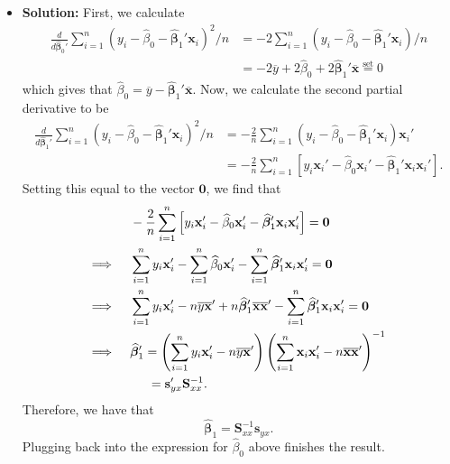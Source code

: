 \documentclass[11pt]{article}
\begin{document}
\begin{itemize}
\item[] \textbf{Solution:}  First, we calculate
\begin{align*}
\frac{d}{d\widehat{\bm\beta}_0'}\sum_{i=1}^n(y_i - \widehat{\beta}_0 - \widehat{\bm\beta}_1'\mathbf{x}_i)^2 / n &= -2\sum_{i=1}^n(y_i - \widehat{\beta}_0 - \widehat{\bm\beta}_1'\mathbf{x}_i) / n \\
&= -2\overline{y} + 2\widehat{\beta}_0 + 2\widehat{\bm\beta}_1'\overline{\mathbf{x}} \overset{\text{set}}{=} 0
\end{align*}
which gives that $\widehat{\beta}_0 = \overline{y} - \widehat{\bm\beta}_1'\overline{\mathbf{x}}$.  Now, we calculate the second partial derivative to be
\begin{align*}
\frac{d}{d\widehat{\bm\beta}_1'}\sum_{i=1}^n(y_i - \widehat{\beta}_0 - \widehat{\bm\beta}_1'\mathbf{x}_i)^2 / n &= -\frac{2}{n}\sum_{i=1}^n(y_i - \widehat{\beta}_0 - \widehat{\bm\beta}_1'\mathbf{x}_i)\mathbf{x}_i' \\
&= -\frac{2}{n}\sum_{i=1}^n\left[y_i\mathbf{x}_i' - \widehat{\beta}_0\mathbf{x}_i' - \widehat{\bm\beta}_1'\mathbf{x}_i\mathbf{x}_i' \right].
\end{align*}
Setting this equal to the vector $\mathbf{0}$, we find that
\begin{align*}
&-\frac{2}{n}\sum_{i=1}^n\left[y_i\mathbf{x}_i' - \widehat{\beta}_0\mathbf{x}_i' - \widehat{\bm\beta}_1'\mathbf{x}_i\mathbf{x}_i' \right] = \mathbf{0} \\
\Longrightarrow\hspace{5mm}& \sum_{i=1}^ny_i\mathbf{x}_i' - \sum_{i=1}^n\widehat{\beta}_0\mathbf{x}_i' - \sum_{i=1}^n\widehat{\bm\beta}_1'\mathbf{x}_i\mathbf{x}_i' = \mathbf{0} \\
\Longrightarrow\hspace{5mm} & \sum_{i=1}^ny_i\mathbf{x}_i' -n\overline{y}\overline{\mathbf{x}}' + n\widehat{\bm\beta}_1'\overline{\mathbf{x}}\overline{\mathbf{x}}' - \sum_{i=1}^n\widehat{\bm\beta}_1'\mathbf{x}_i\mathbf{x}_i' = \mathbf{0} \\
\Longrightarrow \hspace{5mm} & \widehat{\bm\beta}_1' = \left(\sum_{i=1}^ny_i\mathbf{x}_i' -n\overline{y}\overline{\mathbf{x}}'\right)\left(\sum_{i=1}^n\mathbf{x}_i\mathbf{x}_i' - n\overline{\mathbf{x}}\overline{\mathbf{x}}'\right)^{-1} \\
&\hspace{5mm}= \mathbf{s}_{yx}'\mathbf{S}_{xx}^{-1}.
\end{align*}
Therefore, we have that 
\[
\widehat{\bm\beta}_1 = \mathbf{S}_{xx}^{-1}\mathbf{s}_{yx}.
\]
Plugging back into the expression for $\widehat{\beta}_0$ above finishes the result.
\end{itemize}
\end{document}
